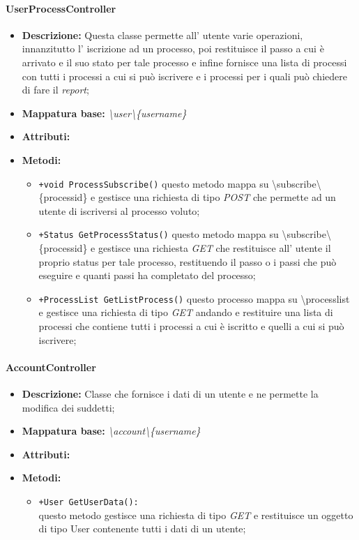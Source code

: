 \paragraph{UserProcessController}%
\begin{itemize}
	\item \textbf{Descrizione: } Questa classe permette all' utente varie operazioni, innanzitutto l' iscrizione ad un processo, poi restituisce il passo a cui è arrivato e il suo stato per tale processo e infine fornisce una lista di processi con tutti i processi a cui si può iscrivere e i processi per i quali può chiedere di fare il \textit{report};
	\item \textbf{Mappatura base: } \textit{\textbackslash user\textbackslash \{username\}}
	\item \textbf{Attributi: }
	\item \textbf{Metodi: }\begin{itemize}
					\item \texttt{+void ProcessSubscribe()} questo metodo mappa su \textbackslash subscribe\textbackslash \{processid\} e gestisce una richiesta di tipo \textit{POST} che permette ad un utente di iscriversi al processo voluto;
					\item \texttt{+Status GetProcessStatus()} questo metodo mappa su \textbackslash subscribe\textbackslash \{processid\} e gestisce una richiesta \textit{GET} che restituisce all' utente il proprio status per tale processo, restituendo il passo o i passi che può eseguire e quanti passi ha completato del processo;
					\item \texttt{+ProcessList GetListProcess()} questo processo mappa su \textbackslash processlist e gestisce una richiesta di tipo \textit{GET} andando e restituire una lista di processi che contiene tutti i processi  a cui è iscritto e quelli a cui si può iscrivere;
				\end{itemize}
\end{itemize}
\paragraph{AccountController}%
\begin{itemize}
	\item \textbf{Descrizione: } Classe che fornisce i dati di un utente e ne permette la modifica dei suddetti;
	\item \textbf{Mappatura base: } \textit{\textbackslash account\textbackslash \{username\}}
	\item \textbf{Attributi: } 
	\item \textbf{Metodi: }\begin{itemize}
					\item \texttt{+User GetUserData():}\\
					questo metodo gestisce una richiesta di tipo \textit{GET} e restituisce un oggetto di tipo User contenente tutti i dati di un utente;
				\end{itemize}
\end{itemize}
